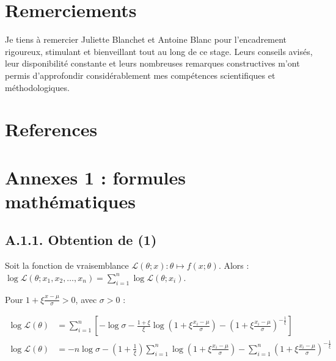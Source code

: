 \documentclass[
  article,
  nofooter,
  noheadings]{jss}
\begin{document}
\section*{Remerciements}\label{remerciements}

Je tiens à remercier Juliette Blanchet et Antoine Blanc pour
l'encadrement rigoureux, stimulant et bienveillant tout au long de ce
stage. Leurs conseils avisés, leur disponibilité constante et leurs
nombreuses remarques constructives m'ont permis d'approfondir
considérablement mes compétences scientifiques et méthodologiques.

\section*{References}\label{references}

\renewcommand{\bibsection}{}


\newpage

\section*{Annexes 1 : formules
mathématiques}\label{annexes-1-formules-mathuxe9matiques}

\subsection*{A.1.1. Obtention de (1)}\label{a.1.1.-obtention-de-1}

Soit la fonction de vraisemblance
\({\displaystyle {\mathcal {L}}(\theta ;x)} : {\displaystyle \theta \mapsto f(x;\theta )}\).
Alors :
\({\displaystyle \log {\mathcal {L}}(\theta ;x_{1},x_{2},\dots ,x_{n})=\sum _{i=1}^{n}\log {\mathcal {L}}(\theta ;x_{i})}\).

Pour \(1 + \xi \frac{x - \mu}{\sigma} > 0\), avec \(\sigma > 0\) :

\[
\begin{aligned}
\log \mathcal{L}(\theta)
&= \sum_{i=1}^n \left[
  -\log \sigma
  - \frac{1 + \xi}{\xi} \log\left(1 + \xi \frac{x_i - \mu}{\sigma} \right)
  - \left(1 + \xi \frac{x_i - \mu}{\sigma} \right)^{-\frac{1}{\xi}}
\right] \\
\log \mathcal{L}(\theta)
&= -n \log \sigma
- \left(1 + \frac{1}{\xi}\right) \sum_{i=1}^n \log\left(1 + \xi \frac{x_i - \mu}{\sigma} \right)
- \sum_{i=1}^n \left(1 + \xi \frac{x_i - \mu}{\sigma} \right)^{-\frac{1}{\xi}}
\end{aligned}
\]
\end{document}
